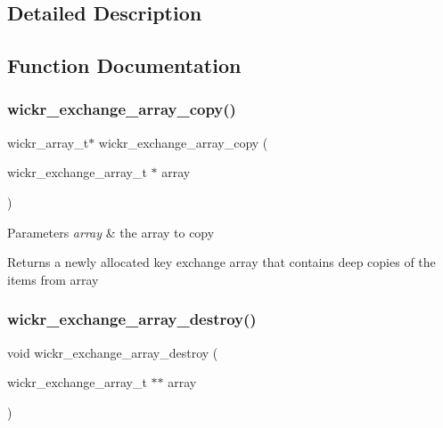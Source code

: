 \subsection{Detailed Description}


\subsection{Function Documentation}
\mbox{\label{group__wickr__key__exchange_gacd04405337871aa3bcd550a051d778e1}} 
\subsubsection{\texorpdfstring{wickr\_exchange\_array\_copy()}{wickr\_exchange\_array\_copy()}}
{\footnotesize\ttfamily wickr\+\_\+array\+\_\+t$\ast$ wickr\+\_\+exchange\+\_\+array\+\_\+copy (\begin{DoxyParamCaption}\item[{wickr\+\_\+exchange\+\_\+array\+\_\+t $\ast$}]{array }\end{DoxyParamCaption})}


\begin{DoxyParams}{Parameters}
{\em array} & the array to copy \\
\hline
\end{DoxyParams}
\begin{DoxyReturn}{Returns}
a newly allocated key exchange array that contains deep copies of the items from \textquotesingle{}array\textquotesingle{} 
\end{DoxyReturn}
\mbox{\label{group__wickr__key__exchange_gadc1e5f5836bc09c1d6b8d6203d02a0eb}} 
\subsubsection{\texorpdfstring{wickr\_exchange\_array\_destroy()}{wickr\_exchange\_array\_destroy()}}
{\footnotesize\ttfamily void wickr\+\_\+exchange\+\_\+array\+\_\+destroy (\begin{DoxyParamCaption}\item[{wickr\+\_\+exchange\+\_\+array\+\_\+t $\ast$$\ast$}]{array }\end{DoxyParamCaption})}


